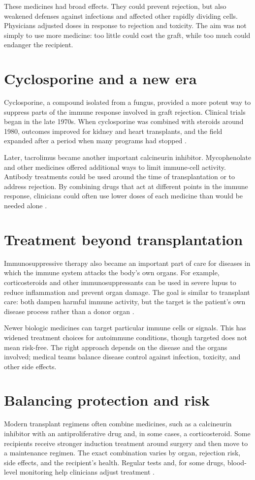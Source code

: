 \documentclass[12pt,oneside]{book}
\begin{document}
These medicines had broad effects. They could prevent rejection, but also
weakened defenses against infections and affected other rapidly dividing
cells. Physicians adjusted doses in response to rejection and toxicity. The
aim was not simply to use more medicine: too little could cost the graft,
while too much could endanger the recipient.

\section{Cyclosporine and a new era}
Cyclosporine, a compound isolated from a fungus, provided a more potent way
to suppress parts of the immune response involved in graft rejection.
Clinical trials began in the late 1970s. When cyclosporine was combined with
steroids around 1980, outcomes improved for kidney and heart transplants,
and the field expanded after a period when many programs had stopped
\cite{renalTransplantDevelopment,heartTransplantReview}.

Later, tacrolimus became another important calcineurin inhibitor. Mycophenolate
and other medicines offered additional ways to limit immune-cell activity.
Antibody treatments could be used around the time of transplantation or to
address rejection. By combining drugs that act at different points in the
immune response, clinicians could often use lower doses of each medicine
than would be needed alone \cite{heartTransplantReview}.

\section{Treatment beyond transplantation}
Immunosuppressive therapy also became an important part of care for diseases
in which the immune system attacks the body's own organs. For example,
corticosteroids and other immunosuppressants can be used in severe lupus to
reduce inflammation and prevent organ damage. The goal is similar to
transplant care: both dampen harmful immune activity, but the target is the
patient's own disease process rather than a donor organ \cite{niamsLupus}.

Newer biologic medicines can target particular immune cells or signals. This
has widened treatment choices for autoimmune conditions, though targeted
does not mean risk-free. The right approach depends on the disease and the
organs involved; medical teams balance disease control against infection,
toxicity, and other side effects.

\section{Balancing protection and risk}
Modern transplant regimens often combine medicines, such as a calcineurin
inhibitor with an antiproliferative drug and, in some cases, a corticosteroid.
Some recipients receive stronger induction treatment around surgery and
then move to a maintenance regimen. The exact combination varies by organ,
rejection risk, side effects, and the recipient's health. Regular tests and,
for some drugs, blood-level monitoring help clinicians adjust treatment
\cite{ishltMaintenanceImmunosuppression,niddkKidneyTransplant}.
\end{document}

